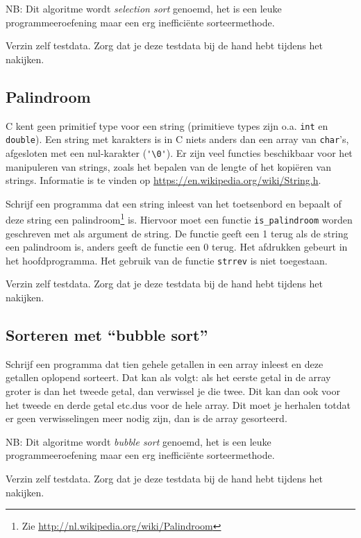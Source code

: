 \documentclass[a4paper,10pt,fleqn,twoside]{article}
\begin{document}
NB: Dit algoritme wordt \textsl{selection sort} genoemd, het is een leuke programmeeroefening maar een erg inefficiënte sorteermethode.

Verzin zelf testdata. Zorg dat je deze testdata bij de hand hebt tijdens het nakijken.

\subsection{Palindroom}
C kent geen primitief type voor een string (primitieve types zijn o.a. \lstinline|int| en \lstinline|double|). Een string met karakters is in C niets anders dan een array van \lstinline|char|’s, afgesloten met een nul-karakter (\lstinline|'\0'|). Er zijn veel functies beschikbaar voor het manipuleren van strings, zoals het bepalen van de lengte of het kopiëren van strings. Informatie is te vinden op \url{https://en.wikipedia.org/wiki/String.h}.

Schrijf een programma dat een string inleest van het toetsenbord en bepaalt of deze string een palindroom\footnote{Zie \url{http://nl.wikipedia.org/wiki/Palindroom}} is. Hiervoor moet een functie \lstinline|is_palindroom| worden geschreven met als argument de string. De functie geeft een 1 terug als de string een palindroom is, anders geeft de functie een 0 terug. Het afdrukken gebeurt in het hoofdprogramma. Het gebruik van de functie \lstinline|strrev| is niet toegestaan.

Verzin zelf testdata. Zorg dat je deze testdata bij de hand hebt tijdens het nakijken.

\subsection{Sorteren met ``bubble sort''}
Schrijf een programma dat tien gehele getallen in een array inleest en deze getallen oplopend sorteert. Dat kan als volgt: als het eerste getal in de array groter is dan het tweede getal, dan verwissel je die twee. Dit kan dan ook voor het tweede en derde getal etc.\@ dus voor de hele array. Dit moet je herhalen totdat er geen verwisselingen meer nodig zijn, dan is de array gesorteerd.

NB: Dit algoritme wordt \textsl{bubble sort} genoemd, het is een leuke programmeeroefening maar een erg inefficiënte sorteermethode.

Verzin zelf testdata. Zorg dat je deze testdata bij de hand hebt tijdens het nakijken.
\end{document}
